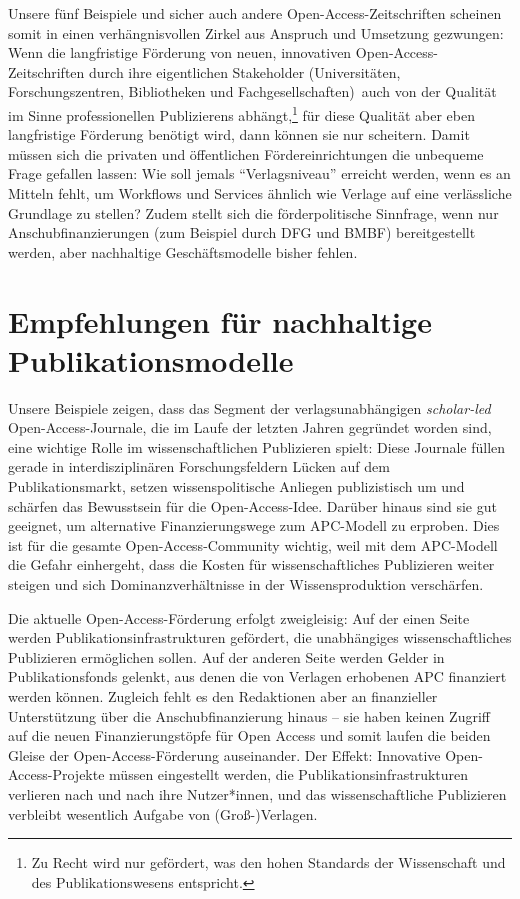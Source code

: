 \documentclass[a4paper,
fontsize=11pt,
oneside,
numbers=noperiodatend,
parskip=half-,
bibliography=totoc,
final
]{scrartcl}
\begin{document}
Unsere fünf Beispiele und sicher auch andere Open-Access-Zeitschriften
scheinen somit in einen verhängnisvollen Zirkel aus Anspruch und
Umsetzung gezwungen: Wenn die langfristige Förderung von neuen,
innovativen Open-Access-Zeitschriften durch ihre eigentlichen
Stakeholder (Universitäten, Forschungszentren, Bibliotheken und
Fachgesellschaften)~auch von der Qualität im Sinne professionellen
Publizierens abhängt,\footnote{Zu Recht wird nur gefördert, was den
  hohen Standards der Wissenschaft und des Publikationswesens
  entspricht.} für diese Qualität aber eben langfristige Förderung
benötigt wird, dann können sie nur scheitern. Damit müssen sich die
privaten und öffentlichen Fördereinrichtungen die unbequeme Frage
gefallen lassen: Wie soll jemals \enquote{Verlagsniveau} erreicht
werden, wenn es an Mitteln fehlt, um Workflows und Services ähnlich wie
Verlage auf eine verlässliche Grundlage zu stellen? Zudem stellt sich
die förderpolitische Sinnfrage, wenn nur Anschubfinanzierungen (zum
Beispiel durch DFG und BMBF) bereitgestellt werden, aber nachhaltige
Geschäftsmodelle bisher fehlen.

\hypertarget{empfehlungen-fuxfcr-nachhaltige-publikationsmodelle}{%
\section*{Empfehlungen für nachhaltige
Publikationsmodelle}\label{empfehlungen-fuxfcr-nachhaltige-publikationsmodelle}}

Unsere Beispiele zeigen, dass das Segment der verlagsunabhängigen
\emph{scholar-led} Open-Access-Journale, die im Laufe der letzten Jahren
gegründet worden sind, eine wichtige Rolle im wissenschaftlichen
Publizieren spielt: Diese Journale füllen gerade in interdisziplinären
Forschungsfeldern Lücken auf dem Publikationsmarkt, setzen
wissenspolitische Anliegen publizistisch um und schärfen das Bewusstsein
für die Open-Access-Idee. Darüber hinaus sind sie gut geeignet, um
alternative Finanzierungswege zum APC-Modell zu erproben. Dies ist für
die gesamte Open-Access-Community wichtig, weil mit dem APC-Modell die
Gefahr einhergeht, dass die Kosten für wissenschaftliches Publizieren
weiter steigen und sich Dominanzverhältnisse in der Wissensproduktion
verschärfen.

Die aktuelle Open-Access-Förderung erfolgt zweigleisig: Auf der einen
Seite werden Publikationsinfrastrukturen gefördert, die unabhängiges
wissenschaftliches Publizieren ermöglichen sollen. Auf der anderen Seite
werden Gelder in Publikationsfonds gelenkt, aus denen die von Verlagen
erhobenen APC finanziert werden können. Zugleich fehlt es den
Redaktionen aber an finanzieller Unterstützung über die
Anschubfinanzierung hinaus -- sie haben keinen Zugriff auf die neuen
Finanzierungstöpfe für Open Access und somit laufen die beiden Gleise
der Open-Access-Förderung auseinander. Der Effekt: Innovative
Open-Access-Projekte müssen eingestellt werden, die
Publikationsinfrastrukturen verlieren nach und nach ihre Nutzer*innen,
und das wissenschaftliche Publizieren verbleibt wesentlich Aufgabe von
(Groß-)Verlagen.
\end{document}
